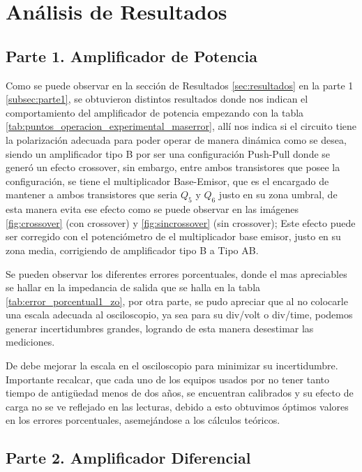 
\section{Análisis de Resultados}

\subsection{Parte 1. Amplificador de Potencia}

Como se puede observar en la sección de Resultados \ref{sec:resultados} en la parte 1 \ref{subsec:parte1}, se obtuvieron distintos resultados donde nos indican el comportamiento del amplificador de potencia empezando con la tabla \ref{tab:puntos_operacion_experimental_maserror}, allí nos indica si el circuito tiene la polarización adecuada para poder operar de manera dinámica como se desea, siendo un amplificador tipo B por ser una configuración Push-Pull donde se generó un efecto crossover, sin embargo, entre ambos transistores que posee la configuración, se tiene el multiplicador Base-Emisor, que es el encargado de mantener a ambos transistores que seria $Q_5$ y $Q_6$ justo en su zona umbral, de esta manera evita ese efecto como se puede observar en las imágenes \ref{fig:crossover} (con crossover) y \ref{fig:sincrossover} (sin crossover); Este efecto puede ser corregido con el potenciómetro de el multiplicador base emisor, justo en su zona media, corrigiendo de amplificador tipo B a Tipo AB.


Se pueden observar los diferentes errores porcentuales, donde el mas apreciables se hallar en la impedancia de salida que se halla en la tabla \ref{tab:error_porcentual1_zo}, por otra parte, se pudo apreciar que al no colocarle una escala adecuada al osciloscopio, ya sea para su div/volt o div/time, podemos generar incertidumbres grandes, logrando de esta manera desestimar las mediciones.

De debe mejorar la escala en el osciloscopio para minimizar su incertidumbre. Importante recalcar, que cada uno de los equipos usados por no tener tanto tiempo de antigüedad menos de dos años, se encuentran calibrados y su efecto de carga no se ve reflejado en las lecturas, debido a esto obtuvimos óptimos valores en los errores porcentuales, asemejándose a los cálculos teóricos.

\subsection{Parte 2. Amplificador Diferencial}

